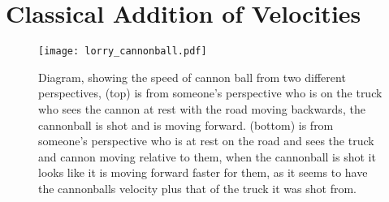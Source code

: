 



\section{Classical Addition of Velocities}\label{Section classical velocity addition}

\begin{figure}[ht]
\centering
       \texttt{[image: lorry\_cannonball.pdf]}
    \caption{Diagram, showing the speed of cannon ball from two different perspectives, (top) is from someone's perspective who is on the truck who sees the cannon at rest with the road moving backwards, the cannonball is shot and is moving forward. (bottom) is from someone's perspective who is at rest on the road and sees the truck and cannon moving relative to them, when the cannonball is shot it looks like it is moving forward faster for them, as it seems to have the cannonballs velocity plus that of the truck it was shot from.}
    \label{fig: truck cannonball}
\end{figure}

